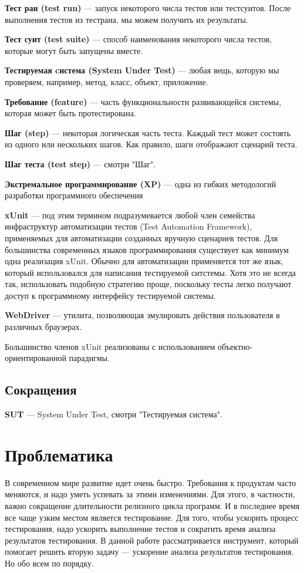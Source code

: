 {\bf Тест ран (test run)} ---
запуск некоторого числа тестов или тестсуитов. После выполнения тестов из тестрана, мы можем получить их результаты.

{\bf Тест суит (test suite)} ---
способ наименования некоторого числа тестов, которые могут быть запущены вместе.

{\bf Тестируемая cистема (System Under Test)} ---
любая вещь, которую мы проверяем, например, метод, класс, объект, приложение.

{\bf Требование (feature)} ---
часть функциональности развивающейся системы, которая может быть протестирована.

{\bf Шаг (step)} ---
некоторая логическая часть теста. Каждый тест может состоять из одного или нескольких шагов. Как правило, шаги отображают сценарий теста.

{\bf Шаг теста (test step)} ---
смотри "Шаг".

{\bf Экстремальное программирование (XP)} ---
одна из гибких методологий разработки программного обеспечения

{\bf xUnit} ---
под этим термином подразумевается любой член семейства инфраструктур автоматизации тестов (Test Automation Framework), применяемых для автоматизации созданных вручную сценариев тестов. Для большинства современных языков программирования существует как минимум одна реализация xUnit. Обычно для автоматизации применяется тот же язык, который использовался для написания тестируемой ситстемы. Хотя это не всегда так, использовать подобную стратегию проще, поскольку тесты легко получают доступ к программному интерфейсу тестируемой системы.

{\bf WebDriver} ---
утилита, позволяющая эмулировать действия пользователя в различных браузерах.

Большинство членов xUnit реализованы с использованием объектно-ориентированной парадигмы.

\subsection{Сокращения}

{\bf SUT} --- System Under Test, смотри "Тестируемая система".

\section{Проблематика}

В современном мире развитие идет очень быстро. Требования к продуктам часто меняются, и надо уметь успевать за этими изменениями. Для этого, в частности, важно сокращение длительности релизного цикла программ. И в последнее время все чаще узким местом является тестирование. Для того, чтобы ускорить процесс тестирования, надо ускорить выполнение тестов и сократить время анализа результатов тестирования. В данной работе рассматривается инструмент, который помогает решить вторую задачу --- ускорение анализа результатов тестирования. Но обо всем по порядку.

